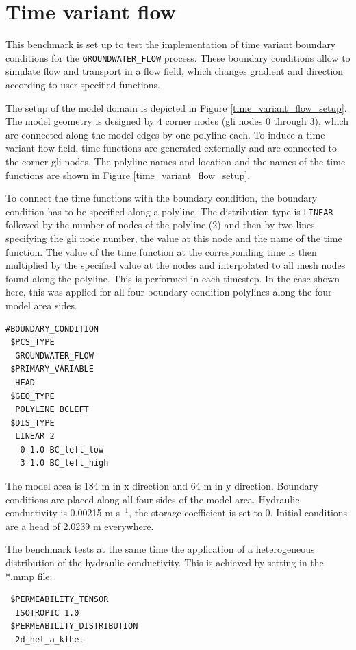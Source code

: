 
\section{Time variant flow}

This benchmark is set up to test the implementation of time variant boundary conditions for the \texttt{GROUNDWATER\_FLOW} process. These boundary conditions allow to simulate flow and transport in a flow field, which changes gradient and direction according to user specified functions.

The setup of the model domain is depicted in Figure \ref{time_variant_flow_setup}. The model geometry is designed by 4 corner nodes (gli nodes 0 through 3), which are connected along the model edges by one polyline each. To induce a time variant flow field, time functions are generated externally and are connected to the corner gli nodes. The polyline names and location and the names of the time functions are shown in Figure \ref{time_variant_flow_setup}.

To connect the time functions with the boundary condition, the boundary condition has to be specified along a polyline. The distribution type is \texttt{LINEAR} followed by the number of nodes of the polyline (2) and then by two lines specifying the gli node number, the value at this node and the name of the time function. The value of the time function at the corresponding time is then multiplied by the specified value at the nodes and interpolated to all mesh nodes found along the polyline. This is performed in each timestep. In the case shown here, this was applied for all four boundary condition polylines along the four model area sides.

\small
\begin{verbatim}
#BOUNDARY_CONDITION
 $PCS_TYPE
  GROUNDWATER_FLOW
 $PRIMARY_VARIABLE
  HEAD
 $GEO_TYPE
  POLYLINE BCLEFT
 $DIS_TYPE
  LINEAR 2
   0 1.0 BC_left_low
   3 1.0 BC_left_high
   \end{verbatim}
\normalsize

The model area is 184 m in x direction and 64 m in y direction. Boundary conditions are placed along all four sides of the model area. Hydraulic conductivity is 0.00215 m s$^{-1}$, the storage coefficient is set to 0. Initial conditions are a head of 2.0239 m everywhere.

The benchmark tests at the same time the application of a heterogeneous distribution of the hydraulic conductivity. This is achieved by setting in the *.mmp file:
\small
\begin{verbatim}
 $PERMEABILITY_TENSOR
  ISOTROPIC 1.0
 $PERMEABILITY_DISTRIBUTION
  2d_het_a_kfhet
\end{verbatim}
\normalsize

